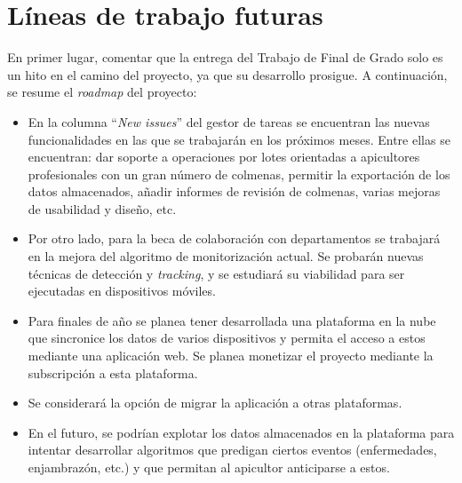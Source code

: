 \section{Líneas de trabajo futuras}\label{luxedneas-de-trabajo-futuras}

En primer lugar, comentar que la entrega del Trabajo de Final de Grado
solo es un hito en el camino del proyecto, ya que su desarrollo
prosigue. A continuación, se resume el \emph{roadmap} del proyecto:

\begin{itemize}
\tightlist
\item  En la columna ``\emph{New issues}'' del gestor de tareas se encuentran
  las nuevas funcionalidades en las que se trabajarán en los próximos
  meses. Entre ellas se encuentran: dar soporte a operaciones por lotes
  orientadas a apicultores profesionales con un gran número de colmenas,
  permitir la exportación de los datos almacenados, añadir informes de
  revisión de colmenas, varias mejoras de usabilidad y diseño, etc.
\item
  Por otro lado, para la beca de colaboración con departamentos se
  trabajará en la mejora del algoritmo de monitorización actual. Se
  probarán nuevas técnicas de detección y \emph{tracking}, y se
  estudiará su viabilidad para ser ejecutadas en dispositivos móviles.
\item
  Para finales de año se planea tener desarrollada una plataforma en la
  nube que sincronice los datos de varios dispositivos y permita el
  acceso a estos mediante una aplicación web. Se planea monetizar el
  proyecto mediante la subscripción a esta plataforma.
\item
  Se considerará la opción de migrar la aplicación a otras plataformas.
\item
  En el futuro, se podrían explotar los datos almacenados en la
  plataforma para intentar desarrollar algoritmos que predigan ciertos
  eventos (enfermedades, enjambrazón, etc.) y que permitan al apicultor
  anticiparse a estos.
\end{itemize}
